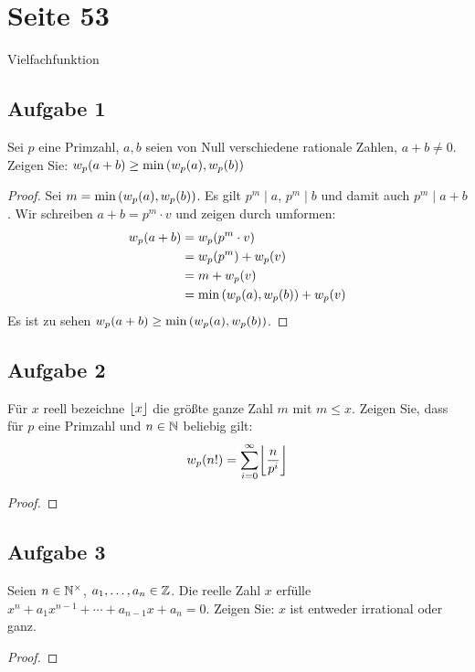 \section{Seite 53}
Vielfachfunktion
\subsection{Aufgabe 1}
Sei $p$ eine Primzahl, $a,b$ seien von Null verschiedene rationale Zahlen,
$a + b \neq 0$. Zeigen Sie: $w_p(a + b) \geq \min{(w_p(a), w_p(b))}$
\begin{proof}
  Sei $m = \min{(w_p(a), w_p(b))}$. Es gilt $p^m \mid a$, $p^m \mid b$
  und damit auch $p^m \mid a + b$. Wir schreiben $a + b = p^m \cdot v$
  und zeigen durch umformen:
  \begin{align*}
    w_p(a + b) & = w_p(p^m \cdot v)                                            \\
                             & = w_p(p^m) + w_p(v)                             \\
                             & = m + w_p(v)                                                  \\
                             & = \min{(w_p(a), w_p(b))} + w_p(v)
  \end{align*}
  Es ist zu sehen $w_p(a + b) \geq \min{(w_p(a), w_p(b))}$.
\end{proof}

\subsection{Aufgabe 2}
Für $x$ reell bezeichne $\lfloor x\rfloor$ die größte ganze Zahl $m$ mit $m \leq x$.
Zeigen Sie, dass für $p$ eine Primzahl und $n \in \mathbb{N}{}$ beliebig gilt:
\begin{equation*}
  \vielfachfunktion{n!} = \sum_{i=0}^{\infty} \floor*{\frac{n}{p^i}}
\end{equation*}
\begin{proof}
\end{proof}

\subsection{Aufgabe 3}
Seien $n \in \mathbb{N}^\times{}$, $a_1,\dotsc,a_n \in \mathbb{Z}{}$.
Die reelle Zahl $x$ erfülle $x^n + a_1x^{n-1} + \dotsb + a_{n - 1}x + a_n = 0$.
Zeigen Sie: $x$ ist entweder irrational oder ganz.
\begin{proof}
\end{proof}


